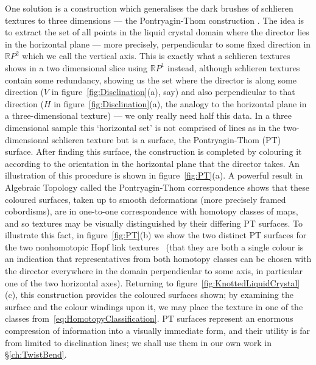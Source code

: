 One solution is a construction which generalises the dark brushes of schlieren textures to three dimensions --- the Pontryagin-Thom construction \citep{ChenThesis,Chen2013,MachonThesis,AlexanderBook}. The idea is to extract the set of all points in the liquid crystal domain where the director lies in the  horizontal plane --- more precisely, perpendicular to some fixed direction in $\mathbb{R}P^2$ which we call the vertical axis. This is exactly what a schlieren textures shows in a two dimensional slice using $\mathbb{R}P^1$ instead, although schlieren textures contain some redundancy, showing us the set where the director is along some direction ($V$ in figure~\ref{fig:Disclination}(a), say) and also perpendicular to that direction ($H$ in figure~\ref{fig:Disclination}(a), the analogy to the horizontal plane in a three-dimensional texture)  --- we only really need half this data. In a three dimensional sample this `horizontal set' is not comprised of lines as in the two-dimensional schlieren texture but is a surface, the Pontryagin-Thom (PT) surface. After finding this surface, the construction is completed by colouring it according to the orientation in the horizontal plane that the director takes. An illustration of this procedure is shown in figure~\ref{fig:PT}(a). A powerful result in Algebraic Topology called the Pontryagin-Thom correspondence \citep{Milnor1997,Hatcher2012} shows that these coloured surfaces, taken up to smooth deformations (more precisely framed cobordisms), are in one-to-one correspondence with homotopy classes of maps, and so textures may be visually distinguished by their differing PT surfaces. To illustrate this fact, in figure~\ref{fig:PT}(b) we show the two distinct PT surfaces for the two nonhomotopic Hopf link textures~\citep{MachonThesis} (that they are both a single colour is an indication that representatives from both homotopy classes can be chosen with the director everywhere in the domain perpendicular to some axis, in particular one of the two horizontal axes). Returning to figure~\ref{fig:KnottedLiquidCrystal}(c), this construction provides the coloured surfaces shown; by examining the surface and the colour windings upon it, we may place the texture in one of the classes from~\eqref{eq:HomotopyClassification}. PT surfaces represent an enormous compression of information into a visually immediate form, and their utility is far from limited to disclination lines; we shall use them in our own work in \S\ref{ch:TwistBend}.

